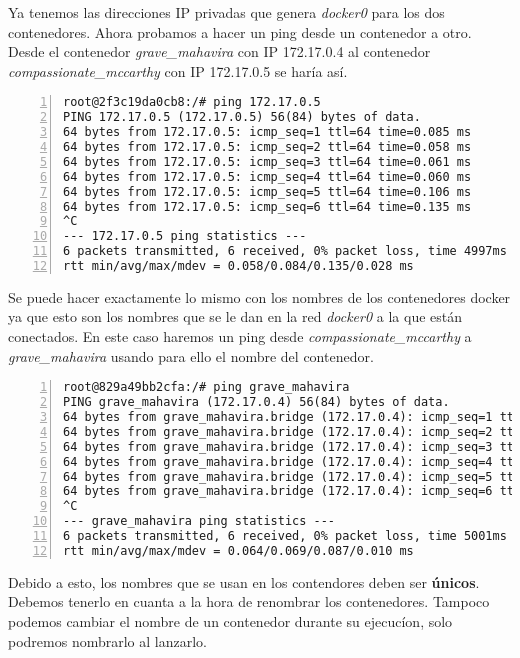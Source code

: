			Ya tenemos las direcciones IP privadas que genera \emph{docker0} para los dos contenedores. Ahora probamos a hacer un ping desde un contenedor a otro. Desde el contenedor \textit{grave\_mahavira} con IP 172.17.0.4 al contenedor \textit{compassionate\_mccarthy} con IP 172.17.0.5 se haría así.
			
			\begin{lstlisting}[style=consola,numbers=left]
root@2f3c19da0cb8:/# ping 172.17.0.5
PING 172.17.0.5 (172.17.0.5) 56(84) bytes of data.
64 bytes from 172.17.0.5: icmp_seq=1 ttl=64 time=0.085 ms
64 bytes from 172.17.0.5: icmp_seq=2 ttl=64 time=0.058 ms
64 bytes from 172.17.0.5: icmp_seq=3 ttl=64 time=0.061 ms
64 bytes from 172.17.0.5: icmp_seq=4 ttl=64 time=0.060 ms
64 bytes from 172.17.0.5: icmp_seq=5 ttl=64 time=0.106 ms
64 bytes from 172.17.0.5: icmp_seq=6 ttl=64 time=0.135 ms
^C
--- 172.17.0.5 ping statistics ---
6 packets transmitted, 6 received, 0% packet loss, time 4997ms
rtt min/avg/max/mdev = 0.058/0.084/0.135/0.028 ms
			\end{lstlisting}
			
			Se puede hacer exactamente lo mismo con los nombres de los contenedores docker ya que esto son los nombres que se le dan en la red \emph{docker0} a la que están conectados. En este caso haremos un ping desde \textit{compassionate\_mccarthy} a \textit{grave\_mahavira} usando para ello el nombre del contenedor.
			
			\begin{lstlisting}[style=consola,numbers=left]
root@829a49bb2cfa:/# ping grave_mahavira
PING grave_mahavira (172.17.0.4) 56(84) bytes of data.
64 bytes from grave_mahavira.bridge (172.17.0.4): icmp_seq=1 ttl=64 time=0.087 ms
64 bytes from grave_mahavira.bridge (172.17.0.4): icmp_seq=2 ttl=64 time=0.066 ms
64 bytes from grave_mahavira.bridge (172.17.0.4): icmp_seq=3 ttl=64 time=0.066 ms
64 bytes from grave_mahavira.bridge (172.17.0.4): icmp_seq=4 ttl=64 time=0.067 ms
64 bytes from grave_mahavira.bridge (172.17.0.4): icmp_seq=5 ttl=64 time=0.066 ms
64 bytes from grave_mahavira.bridge (172.17.0.4): icmp_seq=6 ttl=64 time=0.064 ms
^C
--- grave_mahavira ping statistics ---
6 packets transmitted, 6 received, 0% packet loss, time 5001ms
rtt min/avg/max/mdev = 0.064/0.069/0.087/0.010 ms
			\end{lstlisting}
			
			Debido a esto, los nombres que se usan en los contendores deben ser \textbf{únicos}. Debemos tenerlo en cuanta a la hora de renombrar los contenedores. Tampoco podemos cambiar el nombre de un  contenedor durante su ejecucíon, solo podremos nombrarlo al lanzarlo.
			
